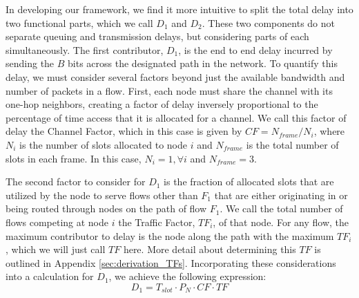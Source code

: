 
In developing our framework, we find it more intuitive to split the total delay into two functional parts, which we call $D_1$ and $D_2$. These two components do not separate queuing and transmission delays, but considering parts of each simultaneously. 
The first contributor, $D_1$, is the end to end delay incurred by sending the $B$ bits across the designated path in the network. To quantify this delay, we must consider several factors beyond just the available bandwidth and number of packets in a flow. First, each node must share the channel with its one-hop neighbors, creating a factor of delay inversely proportional to the percentage of time access that it is allocated for a channel. We call this factor of delay the Channel Factor, which in this case is given by $CF = N_{frame}/N_{i}$, where $N_{i}$ is the number of slots allocated to node $i$ and $N_{frame}$ is the total number of slots in each frame. In this case, $N_{i} = 1, \forall i$ and $N_{frame} = 3$. 

The second factor to consider for $D_1$ is the fraction of allocated slots that are utilized by the node to serve flows other than $F_1$ that are either originating in or being routed through nodes on the path of flow $F_1$.  We call the total number of flows competing at node $i$ the Traffic Factor, $TF_i$, of that node.  For any flow, the maximum contributor to delay is the node along the path with the maximum $TF_i$, which we will just call $TF$ here.  More detail about determining this $TF$ is outlined in Appendix \ref{sec:derivation_TFs}.  Incorporating these considerations into a calculation for $D_1$, we achieve the following expression:  %
\begin{equation}
	D_1 = T_{slot} \cdot P_N \cdot CF \cdot TF
\end{equation}

